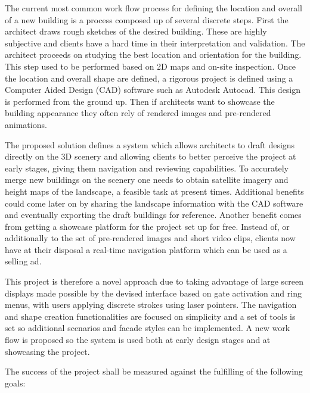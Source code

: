 
The current most common work flow process for defining the location and overall 
of a new building is a process composed up of several discrete steps.
First the architect draws rough sketches of the desired building.
These are highly subjective and clients have a hard time in their interpretation and validation.
The architect proceeds on studying the best location and orientation for the building.
This step used to be performed based on 2D maps and on-site inspection.
Once the location and overall shape are defined, a rigorous project is defined using
a Computer Aided Design (CAD) software such as Autodesk Autocad\cite{SITE-AUTOCAD}.
This design is performed from the ground up.
Then if architects want to showcase the building appearance they often rely of rendered images
and pre-rendered animations.



The proposed solution defines a system which allows architects to draft designs
directly on the 3D scenery and allowing clients to better perceive the project at early stages,
giving them navigation and reviewing capabilities.
To accurately merge new buildings on the scenery one needs to obtain
satellite imagery and height maps of the landscape, a feasible task at present times.
Additional benefits could come later on by sharing the landscape information with the CAD
software and eventually exporting the draft buildings for reference.
Another benefit comes from getting a showcase platform for the project set up for free.
Instead of, or additionally to the set of pre-rendered images and short video clips,
clients now have at their disposal a real-time navigation platform which can be used
as a selling ad.



This project is therefore a novel approach due to taking advantage of large screen displays
made possible by the devised interface based on gate activation and ring menus,
with users applying discrete strokes using laser pointers.
The navigation and shape creation functionalities are focused on simplicity and a set
of tools is set so additional scenarios and facade styles can be implemented.
A new work flow is proposed so the system is used both at early design stages and
at showcasing the project.

The success of the project shall be measured against the fulfilling of the following goals:


